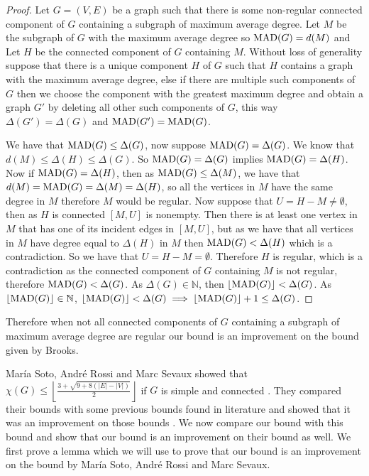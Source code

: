 \documentclass{article}
\newcommand{\MAD}{\ensuremath{\text{\textit{MAD}}}}
\begin{document}
\begin{proof}
Let $G = (V,E)$ be a graph such that there is some non-regular connected component of $G$ containing a subgraph of maximum average degree. 
Let $M$ be the subgraph of $G$ with the maximum average degree so $\MAD(G) = d(M)$ and Let $H$ be the connected component of $G$ containing $M$.
Without loss of generality suppose that there is a unique component $H$ of $G$ such that $H$ contains a graph with the maximum average degree, else if there are multiple such components of $G$ then we choose the component with the greatest maximum degree and obtain a graph $G'$ by deleting all other such components of $G$, this way $\Delta(G') = \Delta(G)$ and $\MAD(G') = \MAD(G)$.

We have that $\MAD(G) \leq \Delta(G)$, now suppose $\MAD(G) = \Delta(G)$. We know that $d(M) \leq \Delta(H) \leq \Delta(G)$.
So $\MAD(G) = \Delta(G)$ implies $\MAD(G) = \Delta(H)$. Now if  $\MAD(G) = \Delta(H)$, then as $\MAD(G) \leq \Delta(M)$, we have that $d(M) = \MAD(G) = \Delta(M) = \Delta(H)$, so all the vertices in $M$ have the same degree in $M$ therefore $M$ would be regular. Now suppose that $U = H - M \neq \emptyset$, then as $H$ is connected $[M,U]$ is nonempty. 
Then there is at least one vertex in $M$ that has one of its incident edges in $[M,U]$, but as we have that all vertices in $M$ have degree equal to $\Delta(H)$ in $M$ then $\MAD(G) < \Delta(H)$ which is a contradiction. So we have that $U = H - M = \emptyset$. Therefore $H$ is regular, which is a contradiction as the connected component of $G$ containing $M$ is not regular, therefore $\MAD(G) < \Delta(G)$.
As $\Delta(G) \in \mathbb{N}$, then $\lfloor \MAD(G) \rfloor < \Delta(G)$. As $\lfloor \MAD(G)\rfloor \in \mathbb{N}$, $\lfloor \MAD(G)\rfloor < \Delta(G) \implies \lfloor \MAD(G) \rfloor + 1 \leq \Delta(G)$.
\end{proof}

Therefore when not all connected components of $G$ containing a subgraph of maximum average degree are regular our bound is an improvement on the bound given by Brooks. 

Mar\'ia Soto, André Rossi and Marc Sevaux showed that $\chi(G) \leq \left\lfloor \frac{3+\sqrt{9+8(|E|-|V|)}}{2} \right\rfloor$ if $G$ is simple and connected \cite{3}. They compared their bounds with some previous bounds found in literature and showed that it was an improvement on those bounds \cite{3}.
We now compare our bound with this bound and show that our bound is an improvement on their bound as well. We first prove a lemma which we will use to prove that our bound is an improvement on the bound by Mar\'ia Soto, André Rossi and Marc Sevaux.
\end{document}
